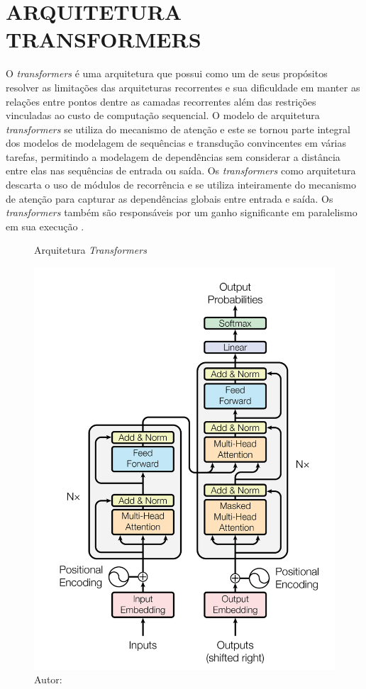 \section{ARQUITETURA TRANSFORMERS}
\label{sec:transformers}

O \textit{transformers} é uma arquitetura que possui como um de seus propósitos resolver as limitações das arquiteturas recorrentes e sua dificuldade em manter as relações entre pontos dentre as camadas recorrentes além das restrições vinculadas ao custo de computação sequencial. O modelo de arquitetura \textit{transformers} se utiliza do mecanismo de atenção e este se tornou parte integral dos modelos de modelagem de sequências e transdução convincentes em várias tarefas, permitindo a modelagem de dependências sem considerar a distância entre elas nas sequências de entrada ou saída. Os \textit{transformers} como arquitetura descarta o uso de módulos de recorrência e se utiliza inteiramente do mecanismo de atenção para capturar as dependências globais entre entrada e saída. Os \textit{transformers} também são responsáveis por um ganho significante em paralelismo em sua execução \cite{vaswaniAttentionAllYou2023}.

\begin{figure}[htbp]
    \centering
    \caption{Arquitetura \textit{Transformers}}
    \includegraphics[scale=0.6]{figures/fig004.png}
    \caption*{Autor: }
    \label{fig:fig004}
\end{figure}

